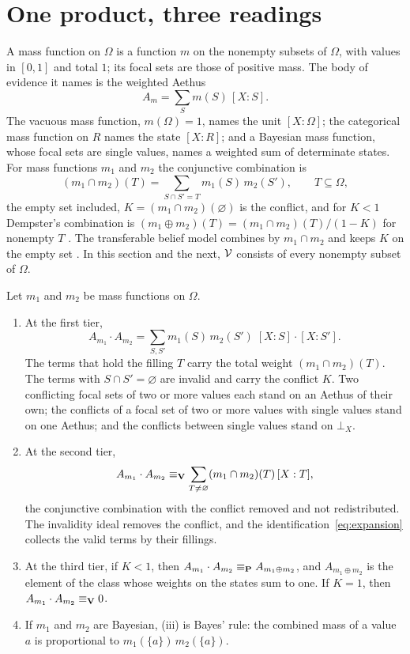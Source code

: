 \section{One product, three readings}\label{sec:tiers}

A mass function on $\Omega$ is a function $m$ on the nonempty subsets of $\Omega$, with values in $[0, 1]$ and total $1$; its focal sets are those of positive mass. The body of evidence it names is the weighted Aethus
\[
A_m = \sum_{S} m(S)\,[X:S] .
\]
The vacuous mass function, $m(\Omega) = 1$, names the unit $[X:\Omega]$; the categorical mass function on $R$ names the state $[X:R]$; and a Bayesian mass function, whose focal sets are single values, names a weighted sum of determinate states. For mass functions $m_1$ and $m_2$ the conjunctive combination is
\[
(m_1 \cap m_2)(T) = \sum_{S \cap S' = T} m_1(S)\, m_2(S'), \qquad T \subseteq \Omega,
\]
the empty set included, $K = (m_1 \cap m_2)(\varnothing)$ is the conflict, and for $K < 1$ Dempster's combination is $(m_1 \oplus m_2)(T) = (m_1 \cap m_2)(T)/(1 - K)$ for nonempty $T$ \cite{dempster1967, shafer1976}. The transferable belief model combines by $m_1 \cap m_2$ and keeps $K$ on the empty set \cite{smets1994}. In this section and the next, $\mathcal{V}$ consists of every nonempty subset of $\Omega$.

\begin{theorem}\label{thm:tiers}
Let $m_1$ and $m_2$ be mass functions on $\Omega$.
\begin{enumerate}
\item[(i)] At the first tier,
\[
A_{m_1} \cdot A_{m_2} = \sum_{S, S'} m_1(S)\, m_2(S') \; [X:S]\cdot[X:S'] .
\]
The terms that hold the filling $T$ carry the total weight $(m_1 \cap m_2)(T)$. The terms with $S \cap S' = \varnothing$ are invalid and carry the conflict $K$. Two conflicting focal sets of two or more values each stand on an Aethus of their own; the conflicts of a focal set of two or more values with single values stand on one Aethus; and the conflicts between single values stand on $\bot_X$.
\item[(ii)] At the second tier,
\[
A_{m_1} \cdot A_{m_2} \equiv_{\mathbf{V}} \sum_{T \neq \varnothing} (m_1 \cap m_2)(T)\, [X:T] ,
\]
the conjunctive combination with the conflict removed and not redistributed. The invalidity ideal removes the conflict, and the identification~\eqref{eq:expansion} collects the valid terms by their fillings.
\item[(iii)] At the third tier, if $K < 1$, then $A_{m_1} \cdot A_{m_2} \equiv_{\mathbf{P}} A_{m_1 \oplus m_2}$, and $A_{m_1 \oplus m_2}$ is the element of the class whose weights on the states sum to one. If $K = 1$, then $A_{m_1}\cdot A_{m_2} \equiv_{\mathbf{V}} 0$.
\item[(iv)] If $m_1$ and $m_2$ are Bayesian, (iii) is Bayes' rule: the combined mass of a value $a$ is proportional to $m_1(\{a\})\, m_2(\{a\})$.
\end{enumerate}
\end{theorem}

